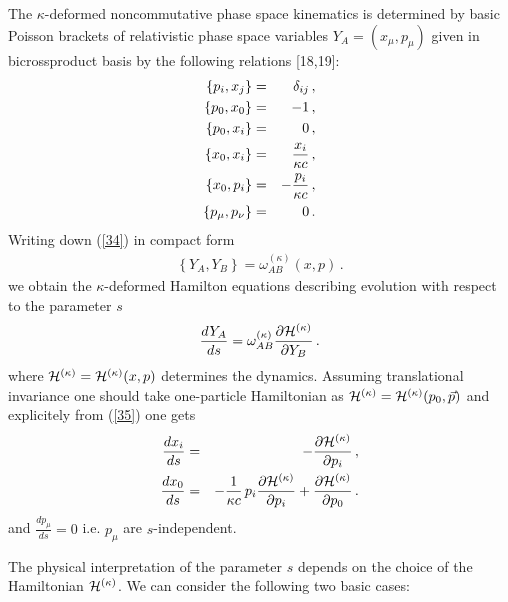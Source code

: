 \documentclass[a4paper,12pt]{article}
\begin{document}
The $\kappa$-deformed noncommutative phase space kinematics is
determined by basic Poisson brackets of relativistic phase space
variables $Y_A = (x_\mu, p_\mu)$ given in bicrossproduct basis by
the following relations [18,19]:
\begin{eqnarray}\label{34}
\left\{  p_i, x_j \right\} & = & \delta_{ij}\, , \cr \left\{ p_0,   x_0
\right\} & = & - 1\, , \cr \left\{ p_0, x_i \right\} & = &
 0\, ,
\cr \left\{ x_0, x_i \right\} & = & \frac{x_i}{\kappa c}\, , \cr
\left\{ x_0, p_i \right\} & = & - \frac{p_i}{\kappa c}\, , \cr
\left\{ p_\mu , p_\nu \right\} & = & 0 \, .
\end{eqnarray}
Writing down (\ref{34}) in compact form
\begin{eqnarray*}\label{nolu*}
  \left\{  Y_A , Y_B\right\} = \omega^{(\kappa)}_{AB} (x,p) \, .
\end{eqnarray*}
we obtain the $\kappa$-deformed Hamilton equations describing evolution with
respect to the parameter $s$
\begin{equation}\label{35}
\frac{dY_A}{ds} = \omega^{(\kappa)}_{AB} \frac{\partial {\cal
H}^{(\kappa)}}{\partial Y_B}\, .
\end{equation}
where $ {\cal H}^{(\kappa)}= {\cal H}^{(\kappa)}(x,p)$ determines
the dynamics. Assuming translational invariance one should take
one-particle Hamiltonian as ${\cal H}^{(\kappa)} = {\cal
H}^{(\kappa)}(p_0 , \vec{p})$ and explicitely from (\ref{35}) one
gets
\renewcommand{\theequation}{36\alph{equation}}
\setcounter{equation}{0}
\begin{eqnarray}\label{36a}
\frac{dx_i}{ds}& = & - \frac{\partial {\cal H}^{(\kappa)}}{\partial p_i}\, ,
\\
\label{36b}  \frac{dx_0}{ds} & = & -\frac{1}{\kappa c} \, p_i
\frac{\partial {\cal H}^{(\kappa)}}{\partial p_i} + \frac{\partial
{\cal H}^{(\kappa)}}{\partial p_0}\, .
\end{eqnarray}
and $ \frac{dp_\mu}{ds} = 0$ i.e. $p_{\mu}$ are $s$-independent.


\renewcommand{\theequation}{\arabic{equation}}
\setcounter{equation}{36}




The physical interpretation of the parameter $s$ depends on the choice of the
Hamiltonian $ {\cal H}^{(\kappa)}$. We can consider the following two basic
cases:
\end{document}
